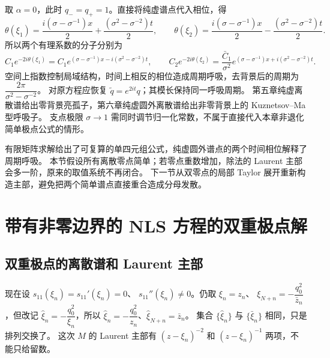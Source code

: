 \documentclass[lang=cn,scheme=chinese,mode=simple,device=normal,color=blue,
math=cm,thmcnt=section,12pt]{elegantbook}
\begin{document}
\begin{callout}
    取 $\alpha=0$，此时 $q_-=q_+=1$。直接将纯虚谱点代入相位，得
    \[
        \theta(\xi_1)=\dfrac{i(\sigma-\sigma^{-1})x}{2}+\dfrac{(\sigma^2-\sigma^{-2})t}{2},\qquad
        \theta(\xi_2)=\dfrac{i(\sigma-\sigma^{-1})x}{2}-\dfrac{(\sigma^2-\sigma^{-2})t}{2}.
    \]
    所以两个有理系数的分子分别为
    \[
        C_1e^{-2i\theta(\xi_1)}=C_1e^{(\sigma-\sigma^{-1})x-i(\sigma^2-\sigma^{-2})t},\qquad
        C_2e^{-2i\theta(\xi_2)}=\dfrac{\bar C_1}{\sigma^2}e^{(\sigma-\sigma^{-1})x+i(\sigma^2-\sigma^{-2})t}.
    \]
    空间上指数控制局域结构，时间上相反的相位造成周期呼吸，去背景后的周期为 $\dfrac{2\pi}{\sigma^2-\sigma^{-2}}$。
    对原方程应恢复 $\widetilde q=e^{2it}q$；其模长保持同一呼吸周期。
    第五章纯虚离散谱给出零背景亮孤子，第六章纯虚圆外离散谱给出非零背景上的 Kuznetsov--Ma 型呼吸子。
    支点极限 $\sigma\to1$ 需同时调节归一化常数，不属于直接代入本章非退化简单极点公式的情形。
\end{callout}


\begin{callout}
    有限矩阵求解给出了可复算的单四元组公式，纯虚圆外谱点的两个时间相位解释了周期呼吸。
    本节假设所有离散零点简单；若零点重数增加，除法的 Laurent 主部会多一阶，原来的取值系统不再闭合。
    下一节从双零点的局部 Taylor 展开重新构造主部，避免把两个简单谱点直接重合造成分母发散。
\end{callout}

\section{带有非零边界的 NLS 方程的双重极点解}
\subsection{双重极点的离散谱和 Laurent 主部}
现在设 $s_{11}(\xi_n)=s_{11}'(\xi_n)=0$、
$s_{11}''(\xi_n)\ne0$。仍取 $\xi_n=z_n$、
$\xi_{N+n}=-\dfrac{q_0^2}{\bar z_n}$，但改记
$\widehat\xi_n=-\dfrac{q_0^2}{\xi_n}$，所以
$\widehat\xi_n=-\dfrac{q_0^2}{z_n}$、$\widehat\xi_{N+n}=\bar z_n$。
集合 $\{\widehat\xi_n\}$ 与 $\{\bar\xi_n\}$ 相同，只是排列交换了。
这次 $M$ 的 Laurent 主部有 $(z-\xi_n)^{-2}$ 和 $(z-\xi_n)^{-1}$ 两项，不能只给留数。
\end{document}
